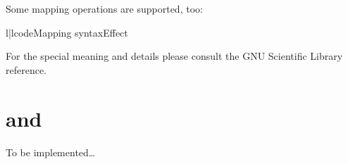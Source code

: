 Some mapping operations are supported, too:\nopagebreak
\begin{tableii}{l|l}{code}{Mapping syntax}{Effect}
\end{tableii}


\begin{seealso}
For the special meaning and details please consult the GNU Scientific Library
reference.
\end{seealso}

\section{\protect{} and \protect{}}

To be implemented\dots


